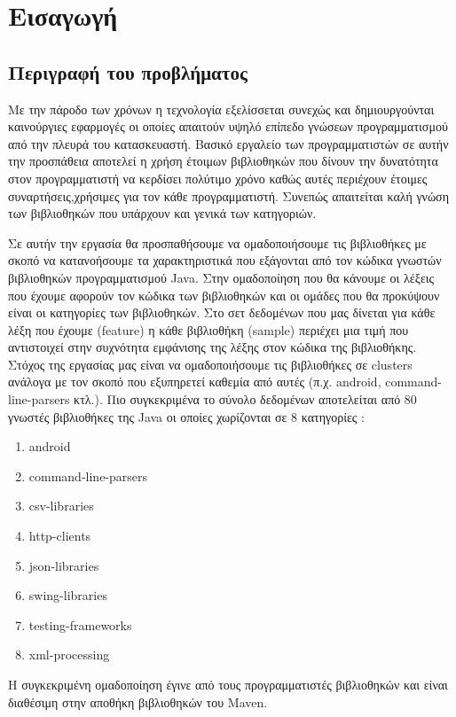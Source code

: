 \chapter{Εισαγωγή}
\section{Περιγραφή του προβλήματος}

Με την πάροδο των χρόνων η τεχνολογία εξελίσσεται συνεχώς και δημιουργούνται καινούργιες εφαρμογές οι οποίες απαιτούν υψηλό επίπεδο γνώσεων προγραμματισμού από την πλευρά του κατασκευαστή. Βασικό εργαλείο των προγραμματιστών σε αυτήν την προσπάθεια αποτελεί η χρήση έτοιμων βιβλιοθηκών που δίνουν την δυνατότητα στον προγραμματιστή να κερδίσει πολύτιμο χρόνο καθώς αυτές περιέχουν έτοιμες συναρτήσεις,χρήσιμες για τον κάθε προγραμματιστή. Συνεπώς απαιτείται καλή γνώση των βιβλιοθηκών που υπάρχουν και γενικά των κατηγοριών.

Σε αυτήν την εργασία θα προσπαθήσουμε να ομαδοποιήσουμε τις βιβλιοθήκες με σκοπό να κατανοήσουμε τα χαρακτηριστικά που εξάγονται από τον κώδικα γνωστών βιβλιοθηκών προγραμματισμού Java. Στην ομαδοποίηση που θα κάνουμε οι λέξεις που έχουμε αφορούν τον κώδικα των βιβλιοθηκών και οι ομάδες που θα προκύψουν είναι οι κατηγορίες των βιβλιοθηκών. Στο σετ δεδομένων που μας δίνεται για κάθε λέξη που έχουμε (feature) η κάθε βιβλιοθήκη (sample) περιέχει μια τιμή που αντιστοιχεί στην συχνότητα εμφάνισης της λέξης στον κώδικα της βιβλιοθήκης. Στόχος της εργασίας μας είναι να ομαδοποιήσουμε τις βιβλιοθήκες σε clusters ανάλογα με τον σκοπό που εξυπηρετεί καθεμία από αυτές (π.χ. android, command-line-parsers κτλ.). Πιο συγκεκριμένα το σύνολο δεδομένων αποτελείται από 80 γνωστές βιβλιοθήκες της Java οι οποίες χωρίζονται σε 8 κατηγορίες :

\begin{enumerate}
	\item  android
	\item  command-line-parsers
	\item  csv-libraries
	\item  http-clients
	\item  json-libraries
	\item  swing-libraries
	\item  testing-frameworks
	\item  xml-processing
\end{enumerate} 

Η συγκεκριμένη ομαδοποίηση έγινε από τους προγραμματιστές βιβλιοθηκών και είναι διαθέσιμη στην αποθήκη βιβλιοθηκών του Maven.

